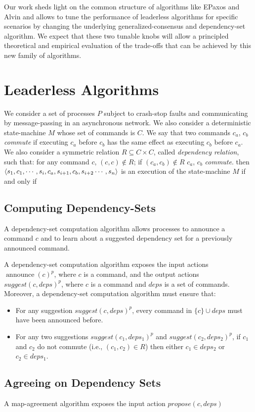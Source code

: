 Our work sheds light on the common structure of algorithms like EPaxos and Alvin and allows to tune the performance of leaderless algorithms for specific scenarios by changing the underlying generalized-consensus and dependency-set algorithm. 
We expect that these two tunable knobs will allow a principled theoretical and empirical evaluation of the trade-offs that can be achieved by this new family of algorithms.

\section{Leaderless Algorithms}

We consider a set of processes $P$ subject to crash-stop faults and communicating by message-passing in an asynchronous network.
We also consider a deterministic state-machine $M$ whose set of commands is $C$. We say that two commands $c_a$, $c_b$ \textit{commute} if executing $c_a$ before $c_b$ has the same effect as executing $c_b$ before $c_a$. We also consider a symmetric relation $R \subseteq C\times C$, called \textit{dependency relation}, such that: for any command $c$, $\left( c,c \right)\notin R$;  if $\left( c_a,c_b \right)\notin R$ $c_a$, $c_b$ \textit{commute}. then $\left\langle s_1,c_1,\cdots,s_i,c_a,s_{i+1},c_b,s_{i+2}\cdots,s_n\right\rangle$ is an execution of the state-machine $M$ if and only if

\subsection{Computing Dependency-Sets}

A dependency-set computation algorithm allows processes to announce a command $c$ and to learn about a suggested dependency set for a previously announced command.

A dependency-set computation algorithm exposes the input actions ${\operatorname{announce}\left( c \right)}^p$, where $c$ is a command, and the output actions ${suggest\left( c, deps \right)}^p$, where $c$ is a command and $deps$ is a set of commands.
Moreover, a dependency-set computation algorithm must ensure that:
\begin{itemize}[noitemsep,nolistsep]
    \item For any suggestion ${suggest\left( c, deps \right)}^p$, every command in $\{c\}\cup deps$ must have been announced before.
    \item For any two suggestions $suggest\left( c_1, deps_1 \right)^p$ and $suggest\left( c_2, deps_2 \right)^p$,  if $c_1$ and $c_2$ do not commute (i.e., $\left( c_1,c_2 \right) \in R$) then either $c_1\in deps_2$ or $c_2 \in deps_1$.
\end{itemize}

\subsection{Agreeing on Dependency Sets}

A map-agreement algorithm exposes the input action $propose\left( c, deps \right)$

\printbibliography%


